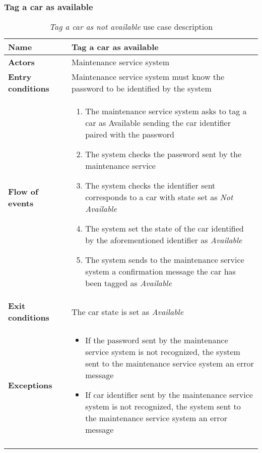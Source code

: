 \subsubsection{Tag a car as available}
\begin{longtable}{p{0.25\linewidth}p{0.75\linewidth}}
\toprule
\textbf{Name} & \textbf{Tag a car as available} \\
\midrule
\textbf{Actors} &  Maintenance service system\\
\midrule
\textbf{Entry conditions} & Maintenance service system must know the password to be identified by the system\\
\midrule
\textbf{Flow of events} & 
\begin{enumerate}
	\item The maintenance service system asks to tag a car as Available sending the car identifier
	paired with the password
	\item The system checks the password sent by the maintenance service
	\item The system checks the identifier sent corresponds to a car with state set as \emph{Not Available}
	\item The system set the state of the car identified by the aforementioned identifier as \emph{Available}
	\item The system sends to the maintenance service system a confirmation message the car has been tagged as \emph{Available}
\end{enumerate} \\
\midrule
\textbf{Exit conditions} & The car state is set as \emph{Available} \\
\midrule
\textbf{Exceptions} & 
\begin{itemize}
	\item If the password sent by the maintenance service system is not recognized, the system sent to the maintenance service system an error message
	\item If car identifier sent by the maintenance service system is not recognized, the system sent to the maintenance service system an error message
\end{itemize} \\
\bottomrule
\caption{\emph{Tag a car as not available} use case description}
\end{longtable}


